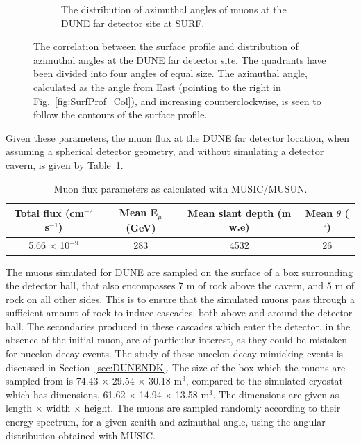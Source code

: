 \begin{figure}[h!]
\begin{subfigure}{0.45\textwidth}
    \caption{The distribution of azimuthal angles of muons at the DUNE far detector site at SURF.}
    \label{fig:SurfProf_Azi}
  \end{subfigure}
  \caption[The correlation between the surface profile and distribution of azimuthal angles at the DUNE far detector site]
          {The correlation between the surface profile and distribution of azimuthal angles at the DUNE far detector site. The quadrants have been divided into four angles of equal size. The azimuthal angle, calculated as the angle from East (pointing to the right in Fig.~\ref{fig:SurfProf_Col}), and increasing counterclockwise, is seen to follow the contours of the surface profile.}
\end{figure}

Given these parameters, the muon flux at the DUNE far detector location, when assuming a spherical detector geometry, and without simulating a detector cavern, is given by Table~\ref{tab:MUSUNflux}. \\
\begin{table}[h!]
\caption[Muon flux parameters as calculated with MUSIC/MUSUN.]
        {Muon flux parameters as calculated with MUSIC/MUSUN.}
\centering
\label{tab:MUSUNflux}
\begin{tabular}{c c c c}
\toprule
{Total flux (cm$^{-2}$ s$^{-1}$)} & {Mean E$_{\mu}$ (GeV)} & {Mean slant depth (m w.e)} & {Mean $\theta$ ($^{\circ}$)} \\ 
\midrule
5.66 $\times$ 10$^{-9}$           & 283                    & 4532                       & 26                           \\
\bottomrule
\end{tabular}
\end{table}

The muons simulated for DUNE are sampled on the surface of a box surrounding the detector hall, that also encompasses 7 m of rock above the cavern, and 5 m of rock on all other sides. This is to ensure that the simulated muons pass through a sufficient amount of rock to induce cascades, both above and around the detector hall. The secondaries produced in these cascades which enter the detector, in the absence of the initial muon, are of particular interest, as they could be mistaken for nucelon decay events. The study of these nucelon decay mimicking events is discussed in Section~\ref{sec:DUNENDK}. The size of the box which the muons are sampled from is 74.43 $\times$ 29.54 $\times$ 30.18 m$^3$, compared to the simulated cryostat which has dimensions, 61.62 $\times$ 14.94 $\times$ 13.58 m$^3$. The dimensions are given as length $\times$ width $\times$ height. The muons are sampled randomly according to their energy spectrum, for a given zenith and azimuthal angle, using the angular distribution obtained with MUSIC. \\

